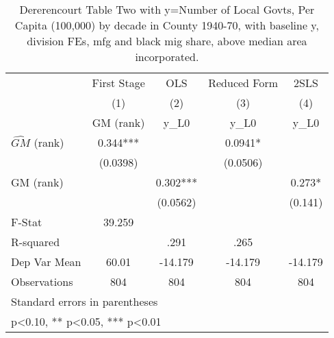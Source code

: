 \begin{table}[htbp]\centering
\def\sym#1{\ifmmode^{#1}\else\(^{#1}\)\fi}
\caption{Dererencourt Table Two with y=Number of Local Govts, Per Capita (100,000) by decade in County 1940-70, with baseline y, division FEs, mfg and black mig share, above median area incorporated.}
\begin{tabular}{l*{4}{c}}
\toprule
                    & First Stage   &         OLS   &Reduced Form   &        2SLS   \\
                    &\multicolumn{1}{c}{(1)}&\multicolumn{1}{c}{(2)}&\multicolumn{1}{c}{(3)}&\multicolumn{1}{c}{(4)}\\
                    &\multicolumn{1}{c}{GM  (rank)}&\multicolumn{1}{c}{y\_L0}&\multicolumn{1}{c}{y\_L0}&\multicolumn{1}{c}{y\_L0}\\
\midrule
$\hat{GM}$ (rank)   &       0.344***&               &      0.0941*  &               \\
                    &    (0.0398)   &               &    (0.0506)   &               \\
\addlinespace
GM  (rank)          &               &       0.302***&               &       0.273*  \\
                    &               &    (0.0562)   &               &     (0.141)   \\
\midrule
F-Stat              &      39.259   &               &               &               \\
R-squared           &               &        .291   &        .265   &               \\
Dep Var Mean        &       60.01   &     -14.179   &     -14.179   &     -14.179   \\
Observations        &         804   &         804   &         804   &         804   \\
\bottomrule
\multicolumn{5}{l}{\footnotesize Standard errors in parentheses}\\
\multicolumn{5}{l}{\footnotesize * p<0.10, ** p<0.05, *** p<0.01}\\
\end{tabular}
\end{table}
